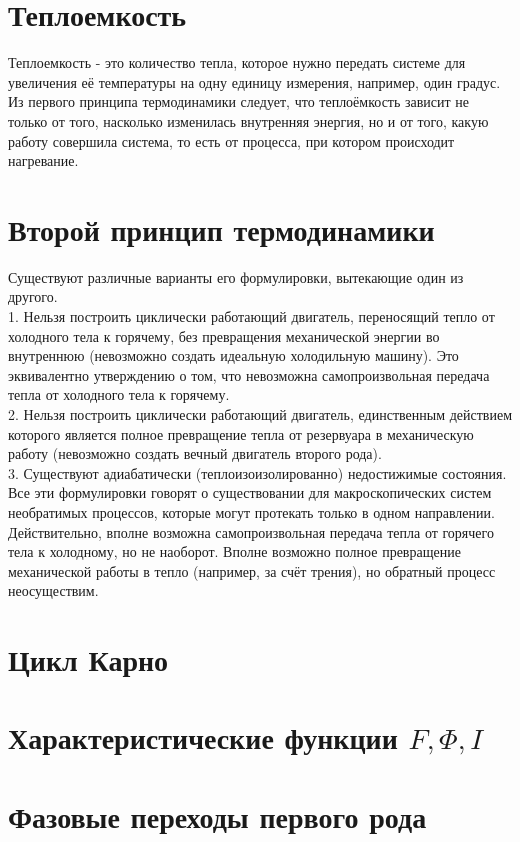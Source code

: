 \begin{multicols*}{2}
		\section{Теплоемкость}
		Теплоемкость - это количество тепла, которое нужно передать системе для увеличения её температуры на одну единицу измерения, например, один градус. Из первого принципа термодинамики следует, что теплоёмкость зависит не только от того, насколько изменилась внутренняя энергия, но и от того, какую работу совершила система, то есть от процесса, при котором происходит нагревание.

		\section{Второй принцип термодинамики}
		Существуют различные варианты его формулировки, вытекающие один из другого.\\
		1. Нельзя построить циклически работающий двигатель, переносящий тепло от холодного тела к горячему, без превращения механической энергии во внутреннюю (невозможно создать идеальную холодильную машину). Это эквивалентно утверждению о том, что невозможна самопроизвольная передача тепла от холодного тела к горячему.\\
		2. Нельзя построить циклически работающий двигатель, единственным действием которого является полное превращение тепла от резервуара в механическую работу (невозможно создать вечный двигатель второго рода).\\
		3. Существуют адиабатически (теплоизоизолированно) недостижимые состояния.\\
		Все эти формулировки говорят о существовании для макроскопических систем необратимых процессов, которые могут протекать только в одном направлении. Действительно, вполне возможна самопроизвольная передача тепла от горячего тела к холодному, но не наоборот. Вполне возможно полное превращение механической работы в тепло (например, за счёт трения), но обратный процесс неосуществим.

		\section{Цикл Карно}

		\section{Характеристические функции $F, \Phi, I$}

		\section{Фазовые переходы первого рода}


\end{multicols*}
